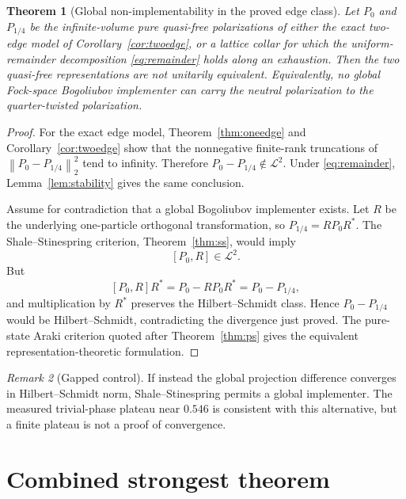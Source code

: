 \documentclass[11pt]{article}
\newtheorem{theorem}{Theorem}[section]
\theoremstyle{remark}
\newtheorem{remark}[theorem]{Remark}
\newcommand{\norm}[1]{\left\lVert #1\right\rVert}
\begin{document}
\begin{theorem}[Global non-implementability in the proved edge class]
\label{thm:nonimpl}
Let $P_0$ and $P_{1/4}$ be the infinite-volume pure quasi-free
polarizations of either the exact two-edge model of
Corollary~\ref{cor:twoedge}, or a lattice collar for which the
uniform-remainder decomposition \eqref{eq:remainder} holds along an
exhaustion.  Then the two quasi-free representations are not unitarily
equivalent.  Equivalently, no global Fock-space Bogoliubov implementer
can carry the neutral polarization to the quarter-twisted polarization.
\end{theorem}

\begin{proof}
For the exact edge model, Theorem~\ref{thm:oneedge} and
Corollary~\ref{cor:twoedge} show that the nonnegative finite-rank
truncations of $\norm{P_0-P_{1/4}}_2^2$ tend to infinity.  Therefore
$P_0-P_{1/4}\notin\mathcal L^2$.  Under
\eqref{eq:remainder}, Lemma~\ref{lem:stability} gives the same conclusion.

Assume for contradiction that a global Bogoliubov implementer exists.
Let $R$ be the underlying one-particle orthogonal transformation, so
$P_{1/4}=RP_0R^*$.  The Shale--Stinespring criterion,
Theorem~\ref{thm:ss}, would imply
\[
 [P_0,R]\in\mathcal L^2.
\]
But
\[
 [P_0,R]R^*=P_0-RP_0R^*=P_0-P_{1/4},
\]
and multiplication by $R^*$ preserves the Hilbert--Schmidt class.
Hence $P_0-P_{1/4}$ would be Hilbert--Schmidt, contradicting the
divergence just proved.  The pure-state Araki criterion quoted after
Theorem~\ref{thm:ps} gives the equivalent representation-theoretic
formulation.
\end{proof}

\begin{remark}[Gapped control]
If instead the global projection difference converges in
Hilbert--Schmidt norm, Shale--Stinespring permits a global implementer.
The measured trivial-phase plateau near $0.546$ is consistent with this
alternative, but a finite plateau is not a proof of convergence.
\end{remark}

\section{Combined strongest theorem}
\end{document}
